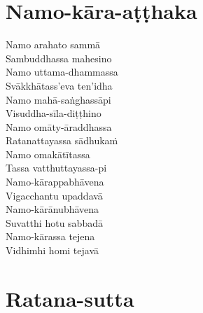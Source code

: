 \clearpage

\chapter{Namo-kāra-aṭṭhaka}%


\begin{paritta}
Namo arahato sammā\\
Sambuddhassa mahesino\\
Namo uttama-dhammassa\\
Svākkhātass'eva ten'idha\\
Namo mahā-saṅghassāpi\\
Visuddha-sīla-diṭṭhino\\
Namo omāty-āraddhassa\\
Ratanattayassa sādhukaṁ\\
Namo omakātītassa\\
Tassa vatthuttayassa-pi\\
Namo-kārappabhāvena\\
Vigacchantu upaddavā\\
Namo-kārānubhāvena\\
Suvatthi hotu sabbadā\\
Namo-kārassa tejena\\
Vidhimhi homi tejavā\\
\end{paritta}

\clearpage

\chapter{Ratana-sutta}%


